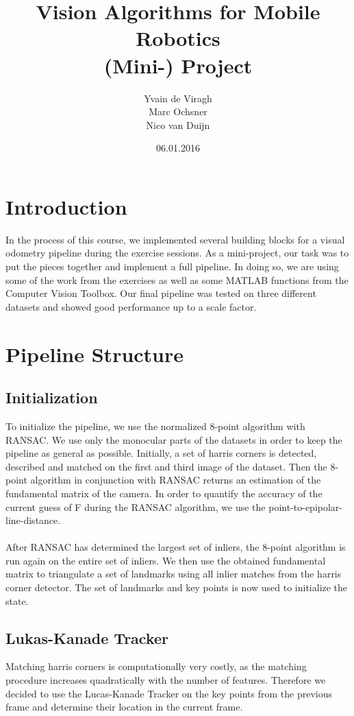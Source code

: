 \documentclass[11pt]{article}
\title{Vision Algorithms for Mobile Robotics\\ (Mini-) Project}
\author{Yvain de Viragh\\Marc Ochsner\\Nico van Duijn}
\date{06.01.2016}
\begin{document}
\maketitle
{}


\section{Introduction}
In the process of this course, we implemented several building blocks for a visual odometry pipeline during the exercise sessions. As a mini-project, our task was to put the pieces together and implement a full pipeline. In doing so, we are using some of the work from the exercises as well as some MATLAB functions from the Computer Vision Toolbox. Our final pipeline was tested on three different datasets and showed good performance up to a scale factor.


\section{Pipeline Structure}
\subsection{Initialization}
To initialize the pipeline, we use the normalized 8-point algorithm with RANSAC. We use only the monocular parts of the datasets in order to keep the pipeline as general as possible. Initially, a set of harris corners is detected, described and matched on the first and third image of the dataset. Then the 8-point algorithm in conjunction with RANSAC returns an estimation of the fundamental matrix of the camera. In order to quantify the accuracy of the current guess of F during the RANSAC algorithm, we use the point-to-epipolar-line-distance.\\
\\
After RANSAC has determined the largest set of inliers, the 8-point algorithm is run again on the entire set of inliers. We then use the obtained fundamental matrix to triangulate a set of landmarks using all inlier matches from the harris corner detector. The set of landmarks and key points is now used to initialize the state.

\subsection{Lukas-Kanade Tracker}
Matching harris corners is computationally very costly, as the matching procedure increases quadratically with the number of features. Therefore we decided to use the Lucas-Kanade Tracker on the key points from the previous frame and determine their location in the current frame. 
\end{document}
